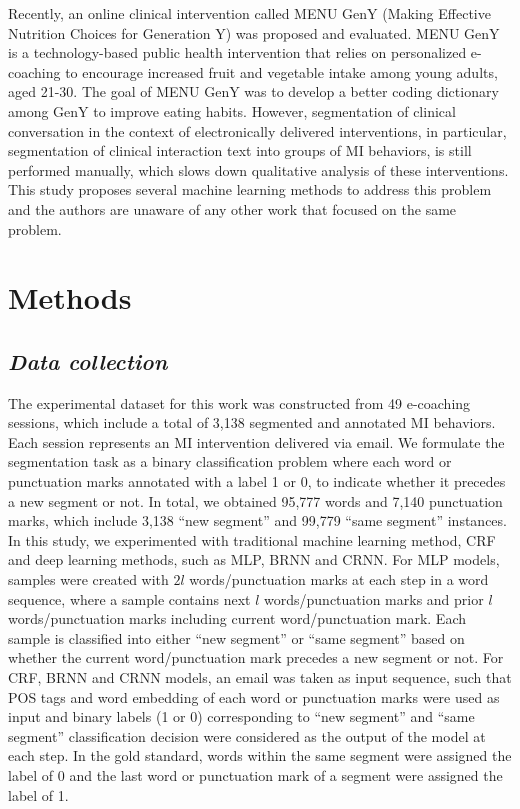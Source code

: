 \documentclass{amia}
\begin{document}

Recently, an online clinical intervention called MENU GenY \cite{alexander2017motivations} (Making Effective Nutrition Choices for Generation Y) was proposed and evaluated. MENU GenY is a technology-based public health intervention that relies on personalized e-coaching to encourage increased fruit and vegetable intake among young adults, aged 21-30. The goal of MENU GenY was to develop a better coding dictionary among GenY to improve eating habits. However, segmentation of clinical conversation in the context of electronically delivered interventions, in particular, segmentation of clinical interaction text into groups of MI behaviors, is still performed manually, which slows down qualitative analysis of these interventions. This study proposes several machine learning methods to address this problem and the authors are unaware of any other work that focused on the same problem.  

\section*{Methods}
\subsection*{\textit{Data collection}}

The experimental dataset for this work was constructed from 49 e-coaching sessions, which include a total of 3,138 segmented and annotated MI behaviors. Each session represents an MI intervention delivered via email. We formulate the segmentation task as a binary classification problem where each word or punctuation marks annotated with a label 1 or 0, to indicate whether it precedes a new segment or not. In total, we obtained 95,777 words and 7,140 punctuation marks, which include 3,138 ``new segment'' and 99,779 ``same segment'' instances. In this study, we experimented with traditional machine learning method, CRF and deep learning methods, such as MLP, BRNN and CRNN. For MLP models, samples were created with $2l$ words/punctuation marks at each step in a word sequence, where a sample contains next $l$ words/punctuation marks and prior $l$ words/punctuation marks including current word/punctuation mark. Each sample is classified into either ``new segment'' or ``same segment'' based on whether the current word/punctuation mark precedes a new segment or not. For CRF, BRNN and CRNN models, an email was taken as input sequence, such that POS tags and word embedding of each word or punctuation marks were used as input and binary labels (1 or 0) corresponding to ``new segment'' and ``same segment'' classification decision were considered as the output of the model at each step. In the gold standard, words within the same segment were assigned the label of 0 and the last word or punctuation mark of a segment were assigned the label of 1.     
\end{document}
